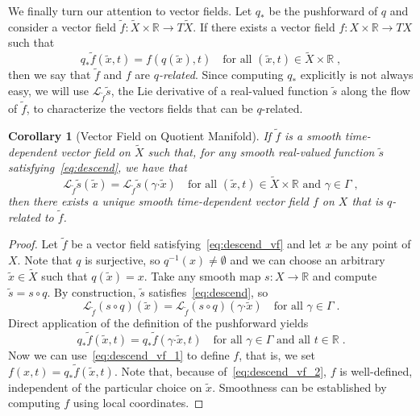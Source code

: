 \documentclass{article}
\newtheorem{corollary}{Corollary}
\theoremstyle{definition}
\theoremstyle{remark}
\newcommand{\bscdot}{\boldsymbol{\cdot}}
\newcommand{\lie}{\mathcal{L}}	%
\newcommand{\DI}{\tilde{X}}	%
\newcommand{\di}{\tilde{x}}	%
\newcommand{\MA}{X}	%
\newcommand{\RR}{\mathbb{R}}	%
\begin{document}
We finally turn our attention to vector fields. Let $q_*$ %
be the pushforward of $q$ and consider a vector field 
$\tilde{f} : \DI\times\RR \to T\DI$. If there exists a vector field $f : \MA\times\RR \to T\MA$ 
such that 
\begin{equation} \label{eq:descend_vf_1}
 q_* \tilde{f}(\di,t) = f(q(\di),t) \quad \text{for all $(\di,t) \in \DI\times\RR$} \;, 
\end{equation}
then we say that $\tilde{f}$ and $f$ are \emph{$q$-related}. Since computing $q_*$ explicitly is not
always easy, we will use $\lie_{\tilde{f}}\tilde{s}$, the Lie derivative of a real-valued function 
$\tilde{s}$ along the flow of $\tilde{f}$, to characterize the vectors fields that can be $q$-related.

\begin{corollary}[Vector Field on Quotient Manifold] \label{cor:descend_vf}
 If $\tilde{f}$ is a smooth time-dependent vector field on $\DI$ such that, for any smooth real-valued function $\tilde{s}$
 satisfying~\eqref{eq:descend}, we have that
 \begin{equation} \label{eq:descend_vf}
  \lie_{\tilde{f}}\tilde{s}(\di) = 
   \lie_{\tilde{f}}\tilde{s}(\gamma\bscdot\di) \quad \text{for all $(\di,t) \in \DI\times\RR$ and $\gamma \in \Gamma$} \;,
 \end{equation}
 then there exists a unique smooth time-dependent vector field $f$ on $\MA$ that is $q$-related to $\tilde{f}$.
\end{corollary}

\begin{proof}
 Let $\tilde{f}$ be a vector field satisfying~\eqref{eq:descend_vf} and let $x$ be any point of
 $\MA$. Note that $q$ is surjective, so $q^{-1}(x) \neq \emptyset$ and we can choose an arbitrary
 $\di \in \DI$ such that $q(\di) = x$. Take any smooth map $s : \MA \to \RR$ and compute
 $\tilde{s} = s\circ q$. By construction, $\tilde{s}$ satisfies~\eqref{eq:descend}, so
 \begin{displaymath}
  \lie_{\tilde{f}}(s\circ q)(\di) = 
   \lie_{\tilde{f}}(s\circ q)(\gamma\bscdot\di) \quad \text{for all $\gamma \in \Gamma$} \;.
 \end{displaymath}
 Direct application of the definition of the pushforward yields
 \begin{equation} \label{eq:descend_vf_2}
  q_*\tilde{f}(\di,t) = q_*\tilde{f}(\gamma\bscdot\di,t) \quad \text{for all $\gamma \in \Gamma$ and all $t \in \RR$} \;.
 \end{equation}
 Now we can use~\eqref{eq:descend_vf_1} to define $f$, that is, we set $f(x,t) = q_* \tilde{f}(\di,t)$.
 Note that, because of~\eqref{eq:descend_vf_2}, $f$ is well-defined, independent of the particular
 choice on $\di$. Smoothness can be established by computing $f$ using local coordinates.
\end{proof}
\end{document}
